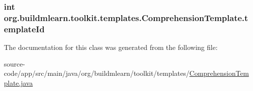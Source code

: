 \subsubsection[{\texorpdfstring{template\+Id}{templateId}}]{\setlength{\rightskip}{0pt plus 5cm}int org.\+buildmlearn.\+toolkit.\+templates.\+Comprehension\+Template.\+template\+Id\hspace{0.3cm}{\ttfamily [private]}}\hypertarget{classorg_1_1buildmlearn_1_1toolkit_1_1templates_1_1ComprehensionTemplate_ae08ea9d3e4cade37472f3521c239c1f7}{}\label{classorg_1_1buildmlearn_1_1toolkit_1_1templates_1_1ComprehensionTemplate_ae08ea9d3e4cade37472f3521c239c1f7}


The documentation for this class was generated from the following file\+:\begin{DoxyCompactItemize}
\item 
source-\/code/app/src/main/java/org/buildmlearn/toolkit/templates/\hyperlink{ComprehensionTemplate_8java}{Comprehension\+Template.\+java}\end{DoxyCompactItemize}
